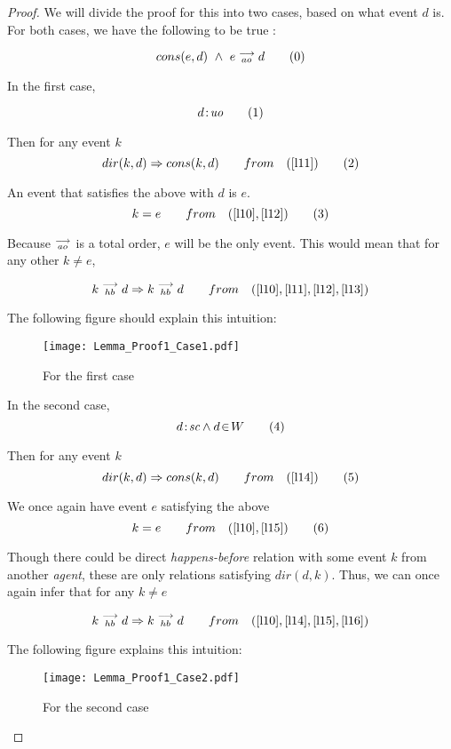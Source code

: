 \begin{proof}
    
    We will divide the proof for this into two cases, based on what event $d$ is. For both cases, we have the following to be true :
    
    \[
        cons(e,d) \ \wedge \ e\stackrel{\longrightarrow}{_{ao}}d
        \tag{0}
        \label{l10}
    \]

    In the first case, 
    
    \[
        d\!:\!\textit{uo} 
        \tag{1}
        \label{l11}
    \]
    
    Then for any event $k$
    \[
        dir(k,d) \Rightarrow cons(k,d)
        \qquad from \quad
        (\ref{l11})
        \tag{2}
        \label{l12}
    \]
    
    An event that satisfies the above with $d$ is $e$.
    \[
         k = e  
         \qquad from \quad
         (\ref{l10}, \ref{l12})
         \tag{3}
         \label{l13}
    \]
    
    Because $\stackrel{\longrightarrow}{_{ao}}$ is a total order, $e$ will be the only event. This would mean that for any other $k \neq e$,
    
    \[
        k\stackrel{\longrightarrow}{_{hb}}d \Rightarrow k\stackrel{\longrightarrow}{_{hb}}d
        \qquad from \quad
        (\ref{l10}, \ref{l11}, \ref{l12}, \ref{l13}) 
    \]
    
    The following figure should explain this intuition:  
    \begin{figure}[H]
        \centering
        \texttt{[image: Lemma\_Proof1\_Case1.pdf]}
        \caption{For the first case}
        \label{fig:my_label}
    \end{figure}
    
    In the second case,
    \[
        d\!:\!\textit{sc} \wedge d\!\in\!W
        \tag{4}
        \label{l14}
    \]
    
    Then for any event $k$
    \[
        dir(k,d) \Rightarrow cons(k,d)
        \qquad from \quad
        (\ref{l14})
        \tag{5}
        \label{l15}
    \]
    
    We once again have event $e$ satisfying the above
    \[
        k = e 
        \qquad from \quad
        (\ref{l10}, \ref{l15})
        \tag{6}
        \label{l16}
    \]
    
    Though there could be direct \textit{happens-before} relation with some event $k$ from another \textit{agent}, these are only relations satisfying $dir(d,k)$. Thus, we can once again infer that for any $k \neq e$ 
    
    \[
        k\stackrel{\longrightarrow}{_{hb}}d \Rightarrow k\stackrel{\longrightarrow}{_{hb}}d
        \qquad from \quad
        (\ref{l10}, \ref{l14}, \ref{l15}, \ref{l16})
    \]
    
    The following figure explains this intuition: 
    
    \begin{figure}[H]
        \centering
        \texttt{[image: Lemma\_Proof1\_Case2.pdf]}
        \caption{For the second case}
        \label{fig:my_label}
    \end{figure}
    
\end{proof}

